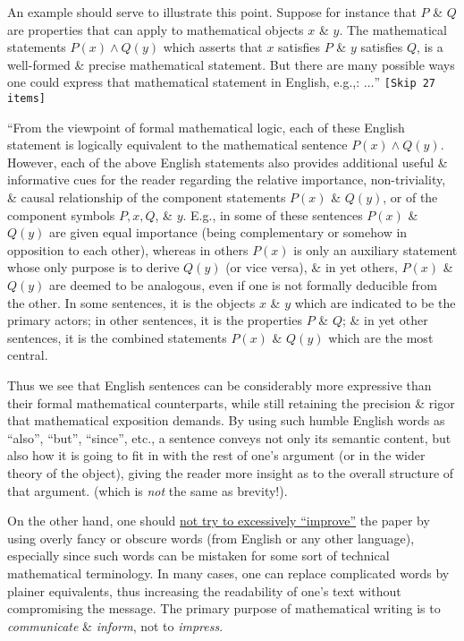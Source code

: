 \documentclass[oneside]{book}
\numberwithin{equation}{section}
\begin{document}
An example should serve to illustrate this point. Suppose for instance that $P$ \& $Q$ are properties that can apply to mathematical objects $x$ \& $y$. The mathematical statements $P(x)\land Q(y)$ which asserts that $x$ satisfies $P$ \& $y$ satisfies $Q$, is a well-formed \& precise mathematical statement. But there are many possible ways one could express that mathematical statement in English, e.g.,: $\ldots$'' \texttt{[Skip 27 items]}

``From the viewpoint of formal mathematical logic, each of these English statement is logically equivalent to the mathematical sentence $P(x)\land Q(y)$. However, each of the above English statements also provides additional useful \& informative cues for the reader regarding the relative importance, non-triviality, \& causal relationship of the component statements $P(x)$ \& $Q(y)$, or of the component symbols $P,x,Q$, \& $y$. E.g., in some of these sentences $P(x)$ \& $Q(y)$ are given equal importance (being complementary or somehow in opposition to each other), whereas in others $P(x)$ is only an auxiliary statement whose only purpose is to derive $Q(y)$ (or vice versa), \& in yet others, $P(x)$ \& $Q(y)$ are deemed to be analogous, even if one is not formally deducible from the other. In some sentences, it is the objects $x$ \& $y$ which are indicated to be the primary actors; in other sentences, it is the properties $P$ \& $Q$; \& in yet other sentences, it is the combined statements $P(x)$ \& $Q(y)$ which are the most central.

Thus we see that English sentences can be considerably more expressive than their formal mathematical counterparts, while still retaining the precision \& rigor that mathematical exposition demands. By using such humble English words as ``also'', ``but'', ``since'', etc., a sentence conveys not only its semantic content, but also how it is going to fit in with the rest of one's argument (or in the wider theory of the object), giving the reader more insight as to the overall structure of that argument.  (which is \textit{not} the same as brevity!).

On the other hand, one should \href{https://terrytao.wordpress.com/advice-on-writing-papers/dont-overoptimise/}{not try to excessively ``improve''} the paper by using overly fancy or obscure words (from English or any other language), especially since such words can be mistaken for some sort of technical mathematical terminology. In many cases, one can replace complicated words by plainer equivalents, thus increasing the readability of one’s text without compromising the message. The primary purpose of mathematical writing is to \textit{communicate} \& \textit{inform}, not to \textit{impress}.
\end{document}
